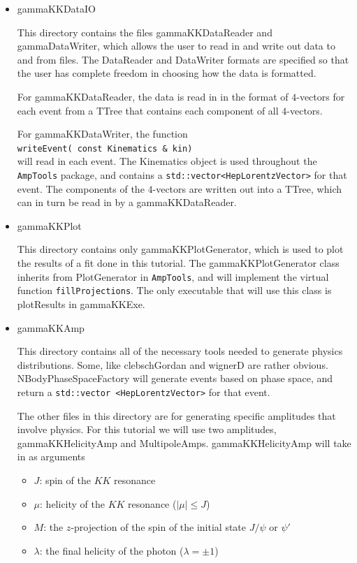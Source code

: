 \documentclass[11pt]{article}
\newcommand{\AmpTools}{{\tt{AmpTools}}}
\begin{document}
\begin{itemize}
\item gammaKKDataIO

This directory contains the files gammaKKDataReader and
gammaDataWriter, which allows the user to read in and write out data
to and from files. The DataReader and DataWriter formats are specified
so that the user has complete freedom in choosing how the data is
formatted.

For gammaKKDataReader, the data is read in in the format of
$4$-vectors for each event from a TTree that contains each
component of all $4$-vectors.

For gammaKKDataWriter, the function \\
{\tt{writeEvent( const Kinematics \& kin)}} \\
will read in each event. The Kinematics object is used throughout the
\AmpTools{} package, and contains a
         {\tt{std::vector<HepLorentzVector>}} for that event. The
         components of the $4$-vectors are written out into a TTree,
         which can in turn be read in by a gammaKKDataReader.

\item gammaKKPlot

This directory contains only gammaKKPlotGenerator, which is used to
plot the results of a fit done in this tutorial. The
gammaKKPlotGenerator class inherits from PlotGenerator in \AmpTools,
and will implement the virtual function {\tt{fillProjections}}. The
only executable that will use this class is plotResults in
gammaKKExe.

\item gammaKKAmp

This directory contains all of the necessary tools needed to generate
physics distributions. Some, like clebschGordan and wignerD are rather
obvious. NBodyPhaseSpaceFactory will generate events based on phase
space, and return a {\tt{std::vector <HepLorentzVector>}} for that
event.

The other files in this directory are for generating specific
amplitudes that involve physics. For this tutorial we will use two
amplitudes, gammaKKHelicityAmp and MultipoleAmps. gammaKKHelicityAmp
will take in as arguments
\begin{itemize}
\item $J$: spin of the $KK$ resonance
\item $\mu$: helicity of the $KK$ resonance ($|\mu| \leq J$)
\item $M$: the $z$-projection of the spin of the initial state
  $J/\psi$ or $\psi'$
\item $\lambda$: the final helicity of the photon ($\lambda = \pm 1$)
\end{itemize}


\end{itemize}
\end{document}
